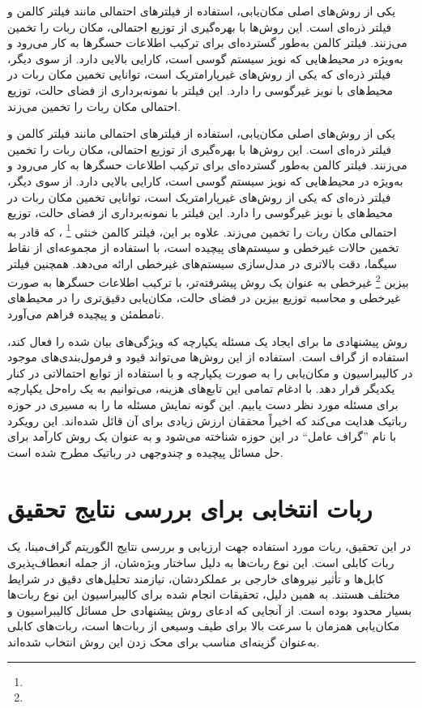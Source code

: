 یکی از روش‌های اصلی مکان‌یابی، استفاده از فیلترهای احتمالی مانند فیلتر کالمن و فیلتر ذره‌ای است. این روش‌ها با بهره‌گیری از توزیع احتمالی، مکان ربات را تخمین می‌زنند. فیلتر کالمن به‌طور گسترده‌ای برای ترکیب اطلاعات حسگرها به کار می‌رود و به‌ویژه در محیط‌هایی که نویز سیستم گوسی است، کارایی بالایی دارد. از سوی دیگر، فیلتر ذره‌ای که یکی از روش‌های غیرپارامتریک است، توانایی تخمین مکان ربات در محیط‌های با نویز غیرگوسی را دارد. این فیلتر با نمونه‌برداری از فضای حالت، توزیع احتمالی مکان ربات را تخمین می‌زند.

یکی از روش‌های اصلی مکان‌یابی، استفاده از فیلترهای احتمالی مانند فیلتر کالمن و فیلتر ذره‌ای است. این روش‌ها با بهره‌گیری از توزیع احتمالی، مکان ربات را تخمین می‌زنند. فیلتر کالمن به‌طور گسترده‌ای برای ترکیب اطلاعات حسگرها به کار می‌رود و به‌ویژه در محیط‌هایی که نویز سیستم گوسی است، کارایی بالایی دارد. از سوی دیگر، فیلتر ذره‌ای که یکی از روش‌های غیرپارامتریک است، توانایی تخمین مکان ربات در محیط‌های با نویز غیرگوسی را دارد. این فیلتر با نمونه‌برداری از فضای حالت، توزیع احتمالی مکان ربات را تخمین می‌زند. علاوه بر این، فیلتر کالمن خنثی
\footnote{}
، که قادر به تخمین حالات غیرخطی و سیستم‌های پیچیده است، با استفاده از مجموعه‌ای از نقاط سیگما، دقت بالاتری در مدل‌سازی سیستم‌های غیرخطی ارائه می‌دهد. همچنین فیلتر بیزین
\footnote{}
 غیرخطی به عنوان یک روش پیشرفته‌تر، با ترکیب اطلاعات حسگرها به صورت غیرخطی و محاسبه توزیع بیزین در فضای حالت، مکان‌یابی دقیق‌تری را در محیط‌های نامطمئن و پیچیده فراهم می‌آورد.

روش پیشنهادی ما برای ایجاد یک مسئله یکپارچه که ویژگی‌های بیان شده را فعال کند، استفاده از گراف است. استفاده از این روش‌ها می‌تواند قیود و فرمول‌بندی‌های موجود در کالیبراسیون و مکان‌یابی را به صورت یکپارچه و با استفاده از توابع احتمالاتی در کنار یکدیگر قرار دهد. با ادغام تمامی این تابع‌های هزینه، می‌توانیم به یک راه‌حل یکپارچه برای مسئله مورد نظر دست یابیم. این گونه نمایش‌ مسئله ما را به مسیری در حوزه رباتیک هدایت می‌کند که اخیراً محققان ارزش زیادی برای آن قائل شده‌اند. این رویکرد با نام ”گراف عامل“ در این حوزه شناخته می‌شود و به عنوان یک روش کارآمد برای حل مسائل پیچیده و چندوجهی در رباتیک مطرح شده است. 

\section{ربات انتخابی برای بررسی نتایج تحقیق}

در این تحقیق، ربات مورد استفاده جهت ارزیابی و بررسی نتایج الگوریتم گراف‌مبنا، یک ربات کابلی است. این نوع ربات‌ها به دلیل ساختار ویژه‌شان، از جمله انعطاف‌پذیری کابل‌ها و تأثیر نیروهای خارجی بر عملکردشان، نیازمند تحلیل‌های دقیق در شرایط مختلف هستند. به همین دلیل، تحقیقات انجام شده برای کالیبراسیون این نوع ربات‌ها بسیار محدود بوده است. از آنجایی که ادعای روش پیشنهادی حل مسائل کالیبراسیون و مکان‌یابی همزمان با سرعت بالا برای طیف وسیعی از ربات‌ها است، ربات‌های کابلی به‌عنوان گزینه‌ای مناسب برای محک زدن این روش انتخاب شده‌اند.


